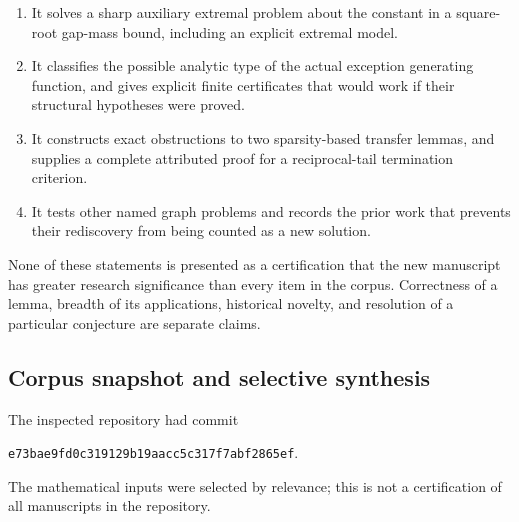 \documentclass[11pt,a4paper]{article}
\theoremstyle{definition}
\theoremstyle{remark}\newtheorem{remark}[theorem]{Remark}
\begin{document}
\begin{enumerate}
\item It solves a sharp auxiliary extremal problem about the constant
in a square-root gap-mass bound, including an explicit extremal model.
\item It classifies the possible analytic type of the actual exception
generating function, and gives explicit finite certificates that would
work if their structural hypotheses were proved.
\item It constructs exact obstructions to two sparsity-based transfer
lemmas, and supplies a complete attributed proof for a reciprocal-tail
termination criterion.
\item It tests other named graph problems and records the prior work
that prevents their rediscovery from being counted as a new solution.
\end{enumerate}

None of these statements is presented as a certification that the new
manuscript has greater research significance than every item in the
corpus. Correctness of a lemma, breadth of its applications, historical
novelty, and resolution of a particular conjecture are separate claims.

\subsection{Corpus snapshot and selective synthesis}

The inspected repository \cite{Corpus} had commit
\begin{center}\small
\texttt{e73bae9fd0c319129b19aacc5c317f7abf2865ef}.
\end{center}
The mathematical inputs were selected by relevance; this is not a
certification of all manuscripts in the repository.
\end{document}
